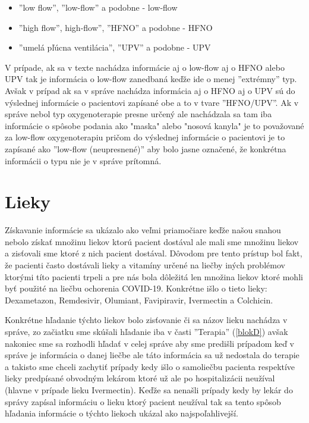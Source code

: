 \begin{itemize}
	\item ''low flow'', ''low-flow'' a podobne - low-flow
	\item ''high flow'', high-flow'', ''HFNO'' a podobne - HFNO
	\item ''umelá pľúcna ventilácia'', ''UPV'' a podobne - UPV
\end{itemize}

V prípade, ak sa v texte nachádza informácie aj o low-flow aj o HFNO alebo UPV tak je informácia o low-flow zanedbaná keďže ide o menej ''extrémny'' typ. Avšak v prípad ak sa v správe nachádza informácia aj o HFNO aj o UPV sú do výslednej informácie o pacientovi zapísané obe a to v tvare ''HFNO/UPV''. Ak v správe nebol typ oxygenoterapie presne určený ale nachádzala sa tam iba informácie o spôsobe podania ako "maska" alebo "nosová kanyla" je to považované za low-flow oxygenoterapiu pričom do výslednej informácie o pacientovi je to zapísané ako ''low-flow (neupresnené)'' aby bolo jasne označené, že konkrétna informácii o typu nie je v správe prítomná.

\section{Lieky}

Získavanie informácie sa ukázalo ako veľmi priamočiare keďže našou snahou nebolo získať množinu liekov ktorú pacient dostával ale mali sme množinu liekov a zisťovali sme ktoré z nich pacient dostával. Dôvodom pre tento prístup bol fakt, že pacienti často dostávali lieky a vitamíny určené na liečby iných problémov ktorými títo pacienti trpeli a pre nás bola dôležitá len množina liekov ktoré mohli byť použité na liečbu ochorenia COVID-19. Konkrétne išlo o tieto lieky: Dexametazon, Remdesivir, Olumiant, Favipiravir, Ivermectin a Colchicin.

Konkrétne hľadanie týchto liekov bolo zisťovanie či sa názov lieku nachádza v správe, zo začiatku sme skúšali hľadanie iba v časti ''Terapia'' (\ref{blokD}) avšak nakoniec sme sa rozhodli hľadať v celej správe aby sme predišli prípadom keď v správe je informácia o danej liečbe ale táto informácia sa už nedostala do terapie a takisto sme chceli zachytiť prípady kedy išlo o samoliečbu pacienta respektíve lieky predpísané obvodným lekárom ktoré už ale po hospitalizácii neužíval (hlavne v prípade lieku Ivermectin). Keďže sa nenašli prípady kedy by lekár do správy zapísal informáciu o lieku ktorý pacient neužíval tak sa tento spôsob hľadania informácie o týchto liekoch ukázal ako najspoľahlivejší.
 

